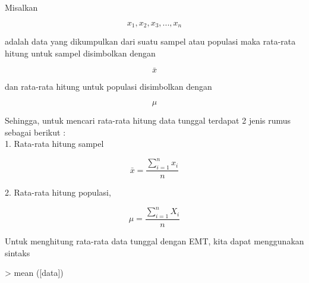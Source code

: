 \documentclass[a4paper,10pt]{article}
\begin{document}
\begin{eulernotebook}
\begin{eulercomment}
\begin{eulercomment}
\begin{eulercomment}
\begin{eulercomment}
\begin{eulercomment}
\begin{eulercomment}
\begin{eulercomment}
\begin{eulercomment}
\begin{eulercomment}
\begin{eulercomment}
\begin{eulercomment}
\begin{eulercomment}
\begin{eulercomment}
\end{eulercomment}
\begin{eulercomment}
Misalkan\\
\end{eulercomment}
\begin{eulerformula}
\[
x_1 , x_2 , x_3 ,..., x_n
\]
\end{eulerformula}
\begin{eulercomment}
adalah data yang dikumpulkan dari suatu sampel atau populasi maka
rata-rata hitung untuk sampel disimbolkan dengan\\
\end{eulercomment}
\begin{eulerformula}
\[
\bar{x}
\]
\end{eulerformula}
\begin{eulercomment}
dan rata-rata hitung untuk populasi disimbolkan dengan\\
\end{eulercomment}
\begin{eulerformula}
\[
\mu
\]
\end{eulerformula}
\begin{eulercomment}
Sehingga, untuk mencari rata-rata hitung data tunggal terdapat 2 jenis
rumus sebagai berikut :\\
1. Rata-rata hitung sampel\\
\end{eulercomment}
\begin{eulerformula}
\[
\bar{x}=\frac{\sum_{i=1}^{n} x_i}{n}
\]
\end{eulerformula}
\begin{eulercomment}
2. Rata-rata hitung populasi,\\
\end{eulercomment}
\begin{eulerformula}
\[
\mu=\frac{\sum_{i=1}^{n} X_i}{n}
\]
\end{eulerformula}
\begin{eulercomment}
Untuk menghitung rata-rata data tunggal dengan EMT, kita dapat
menggunakan sintaks

\textgreater{} mean ([data])


\end{eulercomment}
\end{eulercomment}
\end{eulercomment}
\end{eulercomment}
\end{eulercomment}
\end{eulercomment}
\end{eulercomment}
\end{eulercomment}
\end{eulercomment}
\end{eulercomment}
\end{eulercomment}
\end{eulercomment}
\end{eulercomment}
\end{eulernotebook}
\end{document}
